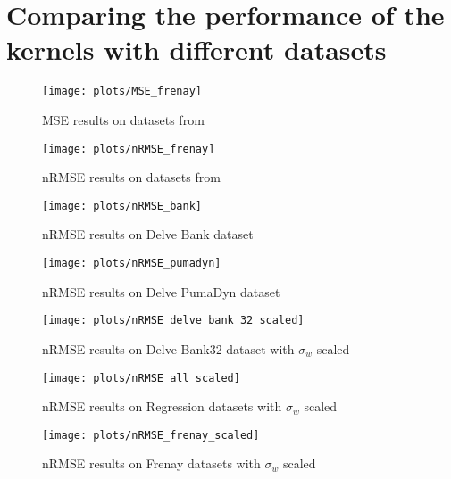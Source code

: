 \section{Comparing the performance of the kernels with different datasets}%

\begin{figure}
    \texttt{[image: plots/MSE\_frenay]}
    \caption{MSE results on datasets from \cite{frenayParameterinsensitiveKernelExtreme2011}}
\end{figure}


\begin{figure}
    \texttt{[image: plots/nRMSE\_frenay]}
    \caption{nRMSE results on datasets from \cite{frenayParameterinsensitiveKernelExtreme2011}}
\end{figure}

\begin{figure}
    \texttt{[image: plots/nRMSE\_bank]}
    \caption{nRMSE results on Delve Bank dataset}
\end{figure}

\begin{figure}
    \texttt{[image: plots/nRMSE\_pumadyn]}
    \caption{nRMSE results on Delve PumaDyn dataset}
\end{figure}

\begin{figure}
    \texttt{[image: plots/nRMSE\_delve\_bank\_32\_scaled]}
    \caption{nRMSE results on Delve Bank32 dataset with $\sigma_w$ scaled}
\end{figure}

\begin{figure}
    \texttt{[image: plots/nRMSE\_all\_scaled]}
    \caption{nRMSE results on Regression datasets with $\sigma_w$ scaled}
\end{figure}

\begin{figure}
    \texttt{[image: plots/nRMSE\_frenay\_scaled]}
    \caption{nRMSE results on Frenay datasets with $\sigma_w$ scaled}
\end{figure}
